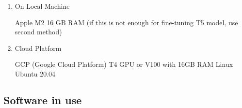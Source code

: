 \documentclass[conference]{IEEEtran}
\begin{document}
\begin{enumerate}[label=\arabic*]
    \begin{enumerate}[label=\arabic*)]
        \item On Local Machine\par
        \vspace{0.3em}
        Apple M2 16 GB RAM (if this is not enough for fine-tuning T5 model, use second method)

        \vspace{0.5em}

        \item Cloud Platform\par
        \vspace{0.3em}
        GCP (Google Cloud Platform) T4 GPU or V100 with 16GB RAM Linux Ubuntu 20.04
    \end{enumerate} 
\end{enumerate}

\vspace{0.7em} %

\subsection{Software in use}
\vspace{0.5em}
\end{document}
